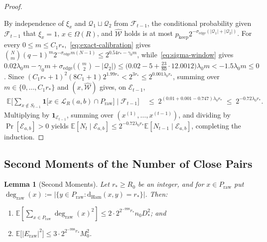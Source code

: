 \documentclass[11pt]{article}
\newtheorem{lemma}[theorem]{Lemma}
\theoremstyle{definition}
\theoremstyle{remark}
\newcommand{\Ham}{\mathrm{Ham}}
\newcommand{\dHam}{\mathrm{d}_{\Ham}}
\begin{document}
\begin{proof}
\begin{enumerate}[label=(\roman*),nosep]
\end{enumerate}
By independence of $\xi_x$ and $\mathcal{Q}_1 \sqcup \mathcal{Q}_2$ from $\mathcal{F}_{t-1}$, the conditional probability given $\mathcal{F}_{t-1}$ that $\xi_x = 1$, $x \in \Omega(R)$, and $\widehat{\mathcal{W}}$ holds is at most $p_{\mathrm{keep}} 2^{-\sigma_{\mathrm{edge}}(|\mathcal{Q}_1| + |\mathcal{Q}_2|)}$. For every $0 \le m \le C_1 r_*$,~\eqref{eq:exact-calibration} gives $\binom{N}{m}(q - 1)^m 2^{-\sigma_{\mathrm{edge}} m(N - 1)} \le 2^{0.54 r_* - \gamma_0 m}$, while~\eqref{eq:sigma-window} gives $0.02\lambda_0 m - \gamma_0 m + \sigma_{\mathrm{edge}}\bigl(\binom{m}{2} - |\mathcal{Q}_2|\bigr) \le \bigl(0.02 - 5 + \frac{23}{80} \cdot 12.0012\bigr)\lambda_0 m < -1.5\lambda_0 m \le 0$. Since $(C_1 r_* + 1)^2 (8 C_1 + 1) 2^{1.99 r_*} < 2^{3 r_*} \le 2^{0.001 \lambda_0 r_*}$, summing over $m \in \{0, \dots, C_1 r_*\}$ and $(x, \widehat{\mathcal{W}})$ gives, on $\mathcal{E}_{t-1}$,
\begin{align*}
\mathbb{E}\Biggl[\sum_{x \notin S_{t-1}} \mathbf{1}\bigl[x \in \mathcal{L}_R(a, b) \cap P_{\mathrm{raw}}\bigr] \;\Bigg|\; \mathcal{F}_{t-1}\Biggr]
&\;\le\; 2^{(0.01 + 0.001 - 0.747)\lambda_0 r_*} \;\le\; 2^{-0.72 \lambda_0 r_*}.
\end{align*}
Multiplying by $\mathbf{1}_{\mathcal{E}_{t-1}}$, summing over $(x^{(1)}, \dots, x^{(t-1)})$, and dividing by $\Pr[\mathcal{E}_{a, b}] > 0$ yields $\mathbb{E}[N_t \mid \mathcal{E}_{a, b}] \le 2^{-0.72 \lambda_0 r_*} \mathbb{E}[N_{t-1} \mid \mathcal{E}_{a, b}]$, completing the induction.
\end{proof}

\subsection{Second Moments of the Number of Close Pairs}
\label{subsec:second-moment}

\begin{lemma}[Second Moments]
\label{lem:second-moment}
Let $r_* \ge R_0$ be an integer, and for $x \in P_{\mathrm{raw}}$ put $\deg_{\mathrm{raw}}(x) := |\{y \in P_{\mathrm{raw}} : \dHam(x, y) = r_*\}|$. Then:
\begin{enumerate}[label=(\arabic*),nosep]
  \item $\mathbb{E}\!\left[\sum_{x \in P_{\mathrm{raw}}} \deg_{\mathrm{raw}}(x)^2\right] \le 2 \cdot 2^{2^{-998} r_*} n_0 D_*^2$; and
  \item $\mathbb{E}\bigl[|E_{\mathrm{raw}}|^2\bigr] \le 3 \cdot 2^{2^{-998} r_*} M_0^2$.
\end{enumerate}
\end{lemma}
\end{document}
